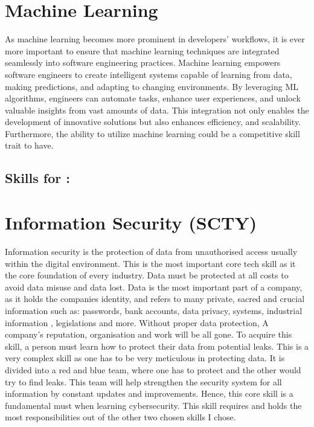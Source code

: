 \documentclass[a4paper, 11pt]{report}
\begin{document}
\section*{\textbf{Machine Learning}}
As machine learning becomes more prominent in developers' workflows, it is ever more important to ensure that machine learning techniques are integrated seamlessly into software engineering practices. Machine learning empowers software engineers to create intelligent systems capable of learning from data, making predictions, and adapting to changing environments. By leveraging ML algorithms, engineers can automate tasks, enhance user experiences, and unlock valuable insights from vast amounts of data. This integration not only enables the development of innovative solutions but also enhances efficiency, and scalability. Furthermore, the ability to utilize machine learning could be a competitive skill trait to have.




\subsection{Skills for \majD: \studD}


\section*{\textbf{Information Security (SCTY)}}

Information security is the protection of data from unauthorised access usually within the digital environment. This is the most important core tech skill as it the core foundation of every industry. Data must be protected at all costs to avoid data misuse and data lost. Data is the most important part of a company, as it holds the companies identity, and refers to many private, sacred and crucial information such as: passwords, bank accounts, data privacy, systems, industrial information , legislations and more. Without proper data protection, A company’s reputation, organisation and work will be all gone. To acquire this skill, a person must learn how to protect their data from potential leaks. This is a very complex skill as one has to be very meticulous in protecting data. It is divided into a red and blue team, where one has to protect and the other would try to find leaks. This team will help strengthen the security system for all information by constant updates and improvements. Hence, this core skill is a fundamental must when learning cybersecurity. This skill requires and holds the most responsibilities out of the other two chosen skills I chose.\\
\end{document}
